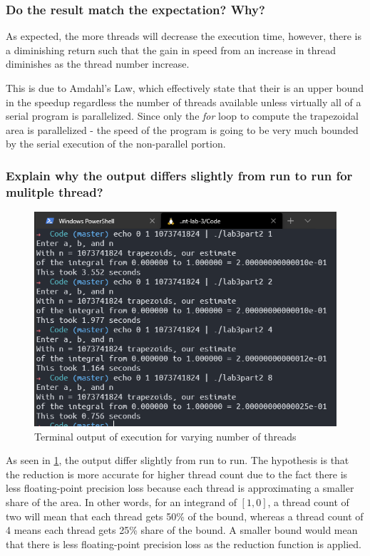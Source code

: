 \subsubsection{Do the result match the expectation? Why?}

As expected, the more threads will decrease the execution time, however, there
is a diminishing return such that the gain in speed from an increase in thread
diminishes as the thread number increase.

This is due to Amdahl's Law, which effectively state that their is an upper bound
in the speedup regardless the number of threads available unless virtually all of 
a serial program is parallelized. Since only the \emph{for} loop to compute 
the trapezoidal area is parallelized - 
the speed of the program is going to be very much bounded by the serial execution
of the non-parallel portion. 


\subsubsection{Explain why the output differs slightly from run to run for mulitple
thread?}

\begin{figure}[ht]
	\centering
	\includegraphics[width=\textwidth]{graphics/P2_c_terminal_output.PNG}
	\caption{Terminal output of execution for varying number of threads}
	\label{fig:lab3part2b}
\end{figure}

As seen in \cref{fig:lab3part2b}, the output differ slightly from run to run. 
The hypothesis is that the reduction is more accurate for higher thread count
due to the fact there is less floating-point precision loss because each thread
is approximating a smaller share of the area. In other words, for an integrand
of $\left[1, 0\right]$, a thread count of two will mean that each thread gets
50\% of the bound, whereas a thread count of 4 means each thread gets 25\% share
of the bound. A smaller bound would mean that there is less floating-point
precision loss as the reduction function is applied.


